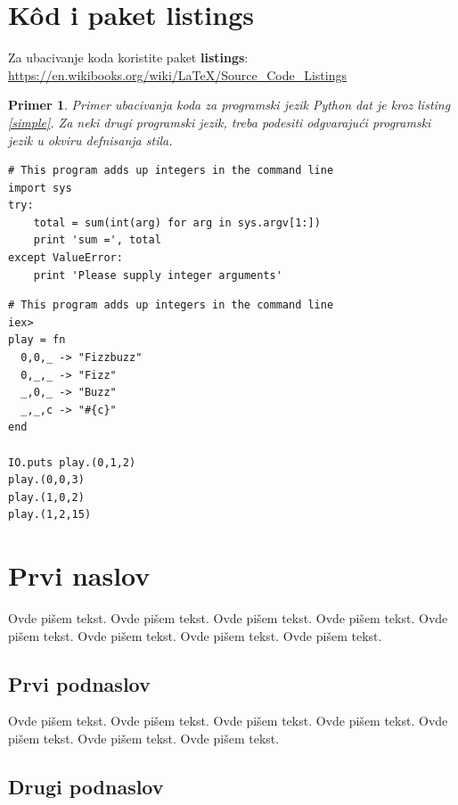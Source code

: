 \documentclass[a4paper]{article}
\newtheorem{primer}{Primer}[section]
\begin{document}
\section{K\^{o}d i paket listings}
Za ubacivanje koda koristite paket \textbf{listings}:
\url{https://en.wikibooks.org/wiki/LaTeX/Source_Code_Listings}

\begin{primer}
Primer ubacivanja koda za programski jezik Python dat je kroz listing \ref{simple}. Za neki drugi programski jezik, treba podesiti odgvarajući programski jezik u okviru defnisanja stila.
\end{primer}
\begin{lstlisting}[caption={Primer ubacivanja koda u tekst},frame=single, label=simple]
# This program adds up integers in the command line
import sys
try:
    total = sum(int(arg) for arg in sys.argv[1:])
    print 'sum =', total
except ValueError:
    print 'Please supply integer arguments'
\end{lstlisting}

\begin{lstlisting}[caption={Primer često zadavanog zadatka Fizzbuzz},frame=single, label=simple]
# This program adds up integers in the command line
iex> 
play = fn
  0,0,_ -> "Fizzbuzz"
  0,_,_ -> "Fizz"
  _,0,_ -> "Buzz"
  _,_,c -> "#{c}"
end

IO.puts play.(0,1,2)
play.(0,0,3)
play.(1,0,2)
play.(1,2,15)
\end{lstlisting}


\section{Prvi naslov}
\label{sec:naslov1}


Ovde pišem tekst. 
Ovde pišem tekst. 
Ovde pišem tekst. 
Ovde pišem tekst. 
Ovde pišem tekst. 
Ovde pišem tekst. 
Ovde pišem tekst. 
Ovde pišem tekst. 


\subsection{Prvi podnaslov}
\label{subsec:podnaslov1}

Ovde pišem tekst. 
Ovde pišem tekst. 
Ovde pišem tekst. 
Ovde pišem tekst. 
Ovde pišem tekst. 
Ovde pišem tekst. 
Ovde pišem tekst. 

\subsection{Drugi podnaslov}
\label{subsec:podnaslov2}
\end{document}
